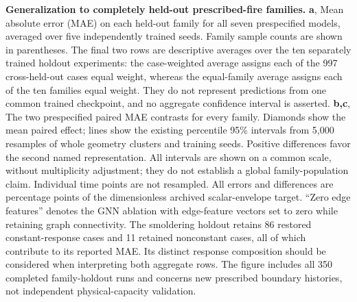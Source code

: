 \textbf{Generalization to completely held-out prescribed-fire families.}
\textbf{a}, Mean absolute error (MAE) on each held-out family for all seven prespecified models, averaged over five independently trained seeds. Family sample counts are shown in parentheses. The final two rows are descriptive averages over the ten separately trained holdout experiments: the case-weighted average assigns each of the 997 cross-held-out cases equal weight, whereas the equal-family average assigns each of the ten families equal weight. They do not represent predictions from one common trained checkpoint, and no aggregate confidence interval is asserted.
\textbf{b,c}, The two prespecified paired MAE contrasts for every family. Diamonds show the mean paired effect; lines show the existing percentile 95\% intervals from 5,000 resamples of whole geometry clusters and training seeds. Positive differences favor the second named representation. All intervals are shown on a common scale, without multiplicity adjustment; they do not establish a global family-population claim. Individual time points are not resampled.
All errors and differences are percentage points of the dimensionless archived scalar-envelope target. ``Zero edge features'' denotes the GNN ablation with edge-feature vectors set to zero while retaining graph connectivity. The smoldering holdout retains 86 restored constant-response cases and 11 retained nonconstant cases, all of which contribute to its reported MAE. Its distinct response composition should be considered when interpreting both aggregate rows. The figure includes all 350 completed family-holdout runs and concerns new prescribed boundary histories, not independent physical-capacity validation.
